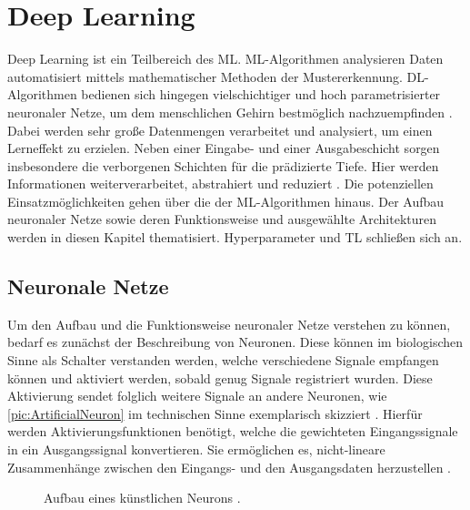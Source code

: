 \chapter{Deep Learning}
\thispagestyle{fancy}
\label{chap:Deep Learning}
\noindent
Deep Learning ist ein Teilbereich des \ac{ML}. \ac{ML}-Algorithmen analysieren Daten automatisiert mittels mathematischer Methoden der Mustererkennung. \ac{DL}-Algorithmen bedienen sich hingegen vielschichtiger und hoch parametrisierter neuronaler Netze, um dem menschlichen Gehirn bestmöglich nachzuempfinden \cite[S.~455-457]{KHA19}. Dabei werden sehr große Datenmengen verarbeitet und analysiert, um einen Lerneffekt zu erzielen. Neben einer Eingabe- und einer Ausgabeschicht sorgen insbesondere die verborgenen Schichten für die prädizierte Tiefe. Hier werden Informationen weiterverarbeitet, abstrahiert und reduziert \cite[S.~131]{ZHA20}. Die potenziellen Einsatzmöglichkeiten gehen über die der \ac{ML}-Algorithmen hinaus. Der Aufbau neuronaler Netze sowie deren Funktionsweise und ausgewählte Architekturen werden in diesen Kapitel thematisiert. Hyperparameter und \ac{TL} schließen sich an.


\section{Neuronale Netze}
\noindent
Um den Aufbau und die Funktionsweise neuronaler Netze verstehen zu können, bedarf es zunächst der Beschreibung von Neuronen. Diese können im biologischen Sinne als Schalter verstanden werden, welche verschiedene Signale empfangen können und aktiviert werden, sobald genug Signale registriert wurden. Diese Aktivierung sendet folglich weitere Signale an andere Neuronen, wie \autoref{pic:ArtificialNeuron} im technischen Sinne exemplarisch skizziert \cite[S.~42]{KRI05}. Hierfür werden Aktivierungsfunktionen benötigt, welche die gewichteten Eingangssignale in ein Ausgangssignal konvertieren. Sie ermöglichen es, nicht-lineare Zusammenhänge zwischen den Eingangs- und den Ausgangsdaten herzustellen \cite[S.~134]{ZHA20}.\\

\begin{figure}[h!]
  \centering
  \caption{Aufbau eines künstlichen Neurons \cite{MCC20}.}
  \label{pic:ArtificialNeuron}
\end{figure}

